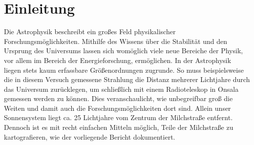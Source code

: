 \section{Einleitung}
Die Astrophysik beschreibt ein großes Feld physikalischer Forschungsmöglichkeiten. Mithilfe des Wissens über die Stabilität und den Ursprung des Universums lassen sich womöglich viele neue Bereiche der Physik, vor allem im Bereich der Energieforschung, ermöglichen.
In der Astrophysik liegen stets kaum erfassbare Größenordnungen zugrunde.
So muss beispielsweise die in diesem Versuch gemessene Strahlung die Distanz mehrerer Lichtjahre durch das Universum zurücklegen, um schließlich mit einem Radioteleskop in Onsala gemessen werden zu können.
Dies veranschaulicht, wie unbegreifbar groß die Weiten und damit auch die Forschungsmöglichkeiten dort sind.
Allein unser Sonnensystem liegt ca. 25 Lichtjahre vom Zentrum der Milchstraße entfernt.
Dennoch ist es mit recht einfachen Mitteln möglich, Teile der Milchstraße zu kartografieren, wie der vorliegende Bericht dokumentiert.
\newline